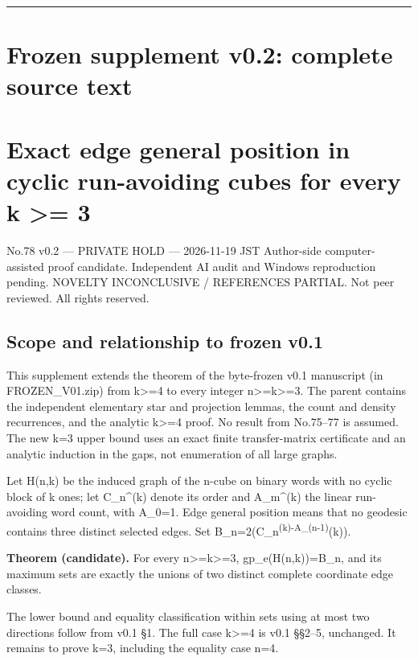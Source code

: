 \documentclass[
  10pt,
]{article}
\begin{document}
\begin{center}\rule{0.5\linewidth}{0.5pt}\end{center}

\section{Frozen supplement v0.2: complete source
text}\label{frozen-supplement-v0.2-complete-source-text}

\section{Exact edge general position in cyclic run-avoiding cubes for
every k \textgreater=
3}\label{exact-edge-general-position-in-cyclic-run-avoiding-cubes-for-every-k-3-1}

No.78 v0.2 --- PRIVATE HOLD --- 2026-11-19 JST Author-side
computer-assisted proof candidate. Independent AI audit and Windows
reproduction pending. NOVELTY INCONCLUSIVE / REFERENCES PARTIAL. Not
peer reviewed. All rights reserved.

\subsection{Scope and relationship to frozen
v0.1}\label{scope-and-relationship-to-frozen-v0.1}

This supplement extends the theorem of the byte-frozen v0.1 manuscript
(in FROZEN\_V01.zip) from k\textgreater=4 to every integer
n\textgreater=k\textgreater=3. The parent contains the independent
elementary star and projection lemmas, the count and density
recurrences, and the analytic k\textgreater=4 proof. No result from
No.75--77 is assumed. The new k=3 upper bound uses an exact finite
transfer-matrix certificate and an analytic induction in the gaps, not
enumeration of all large graphs.

Let H(n,k) be the induced graph of the n-cube on binary words with no
cyclic block of k ones; let C\_n\^{}(k) denote its order and A\_m\^{}(k)
the linear run-avoiding word count, with A\_0=1. Edge general position
means that no geodesic contains three distinct selected edges. Set
B\_n=2(C\_n\textsuperscript{(k)-A\_(n-1)}(k)).

\textbf{Theorem (candidate).} For every n\textgreater=k\textgreater=3,
gp\_e(H(n,k))=B\_n, and its maximum sets are exactly the unions of two
distinct complete coordinate edge classes.

The lower bound and equality classification within sets using at most
two directions follow from v0.1 §1. The full case k\textgreater=4 is
v0.1 §§2--5, unchanged. It remains to prove k=3, including the equality
case n=4.
\end{document}
